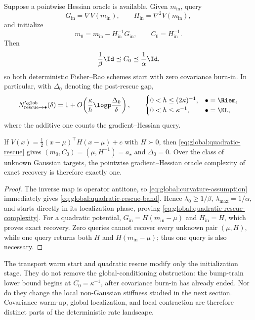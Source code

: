\begin{proposition}
\label{prop:global:quadratic-rescue}
Suppose a pointwise Hessian oracle is available.  Given \(m_{\mathrm{in}}\), query
\begin{equation}
\label{eq:global:quadratic-rescue-query}
    G_{\mathrm{in}}=\nabla V(m_{\mathrm{in}}),
    \qquad
    H_{\mathrm{in}}=\nabla^2V(m_{\mathrm{in}}),
\end{equation}
and initialize
\begin{equation}
\label{eq:global:quadratic-rescue}
    \boxed{
    m_0=m_{\mathrm{in}}-H_{\mathrm{in}}^{-1}G_{\mathrm{in}},
    \qquad
    C_0=H_{\mathrm{in}}^{-1}.}
\end{equation}
Then
\begin{equation}
\label{eq:global:quadratic-rescue-band}
    \frac1\beta\Id\preceq C_0\preceq\frac1\alpha\Id,
\end{equation}
so both deterministic Fisher--Rao schemes start with zero covariance burn-in.  In particular, with
\(\Delta_0\) denoting the post-rescue gap,
\begin{equation}
\label{eq:global:quadratic-rescue-complexity}
    N_{\mathrm{rescue}\to\bullet}^{\glob}(\delta)
    =1+O\!\left(
        \frac\kappa h\logp\frac{\Delta_0}{\delta}
    \right),
    \qquad
    \begin{cases}
        0<h\leq(2\kappa)^{-1}, & \bullet=\Riem,\\
        0<h\leq\kappa^{-1}, & \bullet=\KL,
    \end{cases}
\end{equation}
where the additive one counts the gradient--Hessian query.

If
\(
V(x)=\tfrac12(x-\mu)^\top H(x-\mu)+c
\) with \(H\succ0\), then \eqref{eq:global:quadratic-rescue} gives
\(
(m_0,C_0)=(\mu,H^{-1})=a_\star
\) and \(\Delta_0=0\).  Over the class of unknown Gaussian targets, the pointwise
gradient--Hessian oracle complexity of exact recovery is therefore exactly one.
\end{proposition}

\begin{proof}
The inverse map is operator antitone, so
\eqref{eq:global:curvature-assumption} immediately gives
\eqref{eq:global:quadratic-rescue-band}.  Hence
\(\lambda_0\geq1/\beta\), \(\lambda_{\max}=1/\alpha\), and
 starts directly in its localization phase, proving
\eqref{eq:global:quadratic-rescue-complexity}.  For a quadratic potential,
\(
G_{\mathrm{in}}=H(m_{\mathrm{in}}-\mu)
\) and \(H_{\mathrm{in}}=H\), which proves exact recovery.  Zero queries cannot recover every
unknown pair \((\mu,H)\), while one query returns both \(H\) and \(H(m_{\mathrm{in}}-\mu)\); thus one
query is also necessary.
\end{proof}

The transport warm start and quadratic rescue modify only the initialization stage.  They do not
remove the global-conditioning obstruction: the bump-train lower bound begins at
\(C_0=\kappa^{-1}\), after covariance burn-in has already ended.  Nor do they change the local
non-Gaussian stiffness studied in the next section.  Covariance warm-up, global localization, and
local contraction are therefore distinct parts of the deterministic rate landscape.
